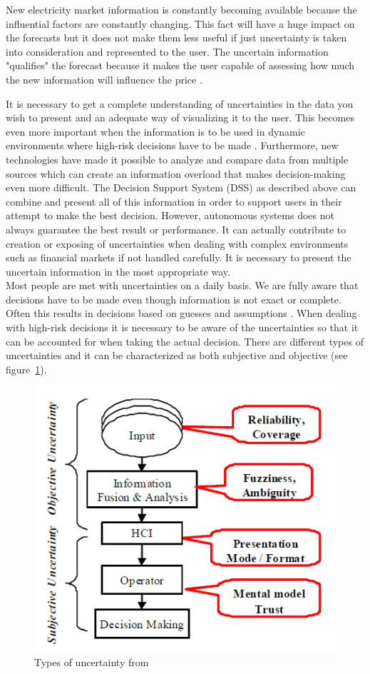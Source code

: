 New electricity market information is constantly becoming available because the influential factors are constantly changing. This fact will have a huge impact on the forecasts but it does not make them less useful if just uncertainty is taken into consideration and represented to the user. The uncertain information "qualifies" the forecast because it makes the user capable of assessing how much the new information will influence the price \cite{EnergyPriceForecasting}.
  
It is necessary to get a complete understanding of uncertainties in the data you wish to present and an adequate way of visualizing it to the user. This becomes even more important when the information is to be used in dynamic environments where high-risk decisions have to be made \cite{UncertainInformation}. Furthermore, new technologies have made it possible to analyze and compare data from multiple sources which can create an information overload that makes decision-making even more difficult. The Decision Support System (DSS) as described above can combine and present all of this information in order to support users in their attempt to make the best decision. However, autonomous systems does not always guarantee the best result or performance. It can actually contribute to creation or exposing of uncertainties when dealing with complex environments such as financial markets \cite{UncertainInformation} if not handled carefully. It is necessary to present the uncertain information in the most appropriate way.
\\[0.5cm]
Most people are met with uncertainties on a daily basis. We are fully aware that decisions have to be made even though information is not exact or complete. Often this results in decisions based on guesses and assumptions \cite{UncertainInformation}. When dealing with high-risk decisions it is necessary to be aware of the uncertainties so that it can be accounted for when taking the actual decision. 
There are different types of uncertainties and it can be characterized as both subjective and objective (see figure~\ref{fig:typesOfUncertainty}). 
\begin{figure}[h!]
\centering
\includegraphics[width=0.7\linewidth,natwidth=898,natheight=587]{billeder/TypesOfUncertainInformation.png}
\caption{Types of uncertainty from \cite{UncertainInformation}}
\label{fig:typesOfUncertainty}
\end{figure}  
